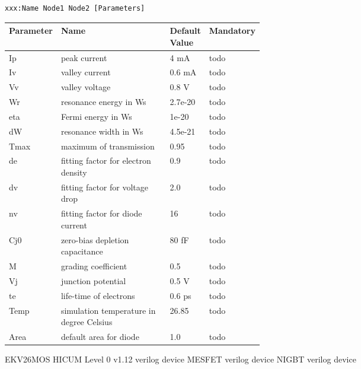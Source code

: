 \begin{verbatim}
xxx:Name Node1 Node2 [Parameters]
\end{verbatim}


\begin{tabular}{|l|p{0.5\linewidth}|l|l|}
\hline
Parameter & Name & Default Value & Mandatory \\
\hline
Ip & peak current & 4 mA & todo \\
Iv & valley current & 0.6 mA & todo \\
Vv & valley voltage & 0.8 V & todo \\
Wr & resonance energy in Ws & 2.7e-20 & todo \\
eta & Fermi energy in Ws & 1e-20 & todo \\
dW & resonance width in Ws & 4.5e-21 & todo \\
Tmax & maximum of transmission & 0.95 & todo \\
de & fitting factor for electron density & 0.9 & todo \\
dv & fitting factor for voltage drop & 2.0 & todo \\
nv & fitting factor for diode current & 16 & todo \\
Cj0 & zero-bias depletion capacitance & 80 fF & todo \\
M & grading coefficient & 0.5 & todo \\
Vj & junction potential & 0.5 V & todo \\
te & life-time of electrons & 0.6 ps & todo \\
Temp & simulation temperature in degree Celsius & 26.85 & todo \\
Area & default area for diode & 1.0 & todo \\
\hline
\end{tabular}





EKV26MOS
HICUM Level 0 v1.12 verilog device
MESFET verilog device
NIGBT verilog device

